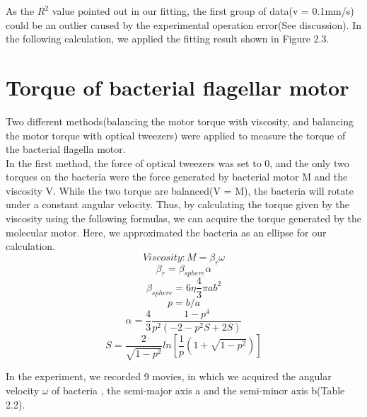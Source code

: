 \documentclass[a4paper,english,12pt,bibliography=totoc]{scrreprt}
\begin{document}
As the $R^2$ value pointed out in our fitting, the first group of data(v = 0.1mm/s) could be an outlier caused by the experimental operation error(See discussion). In the following calculation, we applied the fitting result shown in Figure 2.3.
\section{Torque of bacterial flagellar motor}

Two different methods(balancing the motor torque with viscosity, and balancing the motor torque with optical tweezers) were applied to measure the torque of the bacterial flagella motor.\\

In the first method, the force of optical tweezers was set to 0, and the only two torques on the bacteria were the force generated by bacterial motor M and the viscosity V. While the two torque are balanced(V = M), the bacteria will rotate under a constant angular velocity. Thus, by calculating the torque given by the viscosity using the following formulas, we can acquire the torque generated by the molecular motor. Here, we approximated the bacteria as an ellipse for our calculation. \\

\[ Viscosity: M = \beta_r \omega
\]
 \[
 \beta_r = \beta_{sphere} \alpha
 \]
 \[
 \beta_{sphere} = 6\eta \frac{4}{3} \pi a b^2
 \]
 \[
 p = b/a
 \]
 \[
 \alpha = \frac{4}{3} \frac{1-p^4}{p^2(-2-p^2S+2S)}
 \]
\[
S = \frac{2}{\sqrt{1-p^2}} ln[\frac{1}{p}(1+\sqrt{1-p^2})]
\]

In the experiment, we recorded 9 movies, in which we acquired the angular velocity $\omega$ of bacteria , the semi-major axis a and the semi-minor axis b(Table 2.2).
\end{document}
